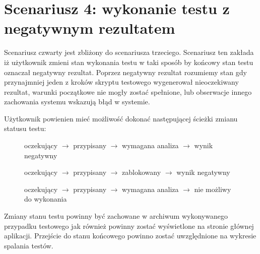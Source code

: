 \section{Scenariusz 4: wykonanie testu z negatywnym rezultatem}

Scenariusz czwarty jest zbliżony do scenariusza trzeciego. Scenariusz ten  zakłada iż użytkownik zmieni stan wykonania testu w taki sposób by końcowy stan testu oznaczał negatywny rezultat. Poprzez negatywny rezultat rozumiemy stan gdy przynajmniej jeden z kroków skryptu testowego wygenerował nieoczekiwany rezultat, warunki początkowe nie mogły zostać spełnione, lub obserwacje innego zachowania systemu wskazują błąd w systemie.

Użytkownik powienien mieć możliwość dokonać następującej ścieżki zmianu statusu testu:

\begin{figure}[h!]
  \begin{center}
   oczekujący $\rightarrow$  przypisany $\rightarrow$ wymagana analiza $\rightarrow$  wynik negatywny
  \end{center}
\end{figure}
\begin{figure}[h!]
  \begin{center}
   oczekujący $\rightarrow$  przypisany $\rightarrow$ zablokowany $\rightarrow$  wynik negatywny
  \end{center}
\end{figure}

\begin{figure}[h!]
  \begin{center}
   oczekujący $\rightarrow$  przypisany $\rightarrow$ wymagana analiza $\rightarrow$  nie możliwy do wykonania
  \end{center}
\end{figure}

Zmiany stanu testu powinny być zachowane w archiwum wykonywanego przypadku testowego jak również powinny zostać wyświetlone na stronie głównej aplikacji. Przejście do stanu końcowego powinno zostać uwzględnione na wykresie spalania testów.

